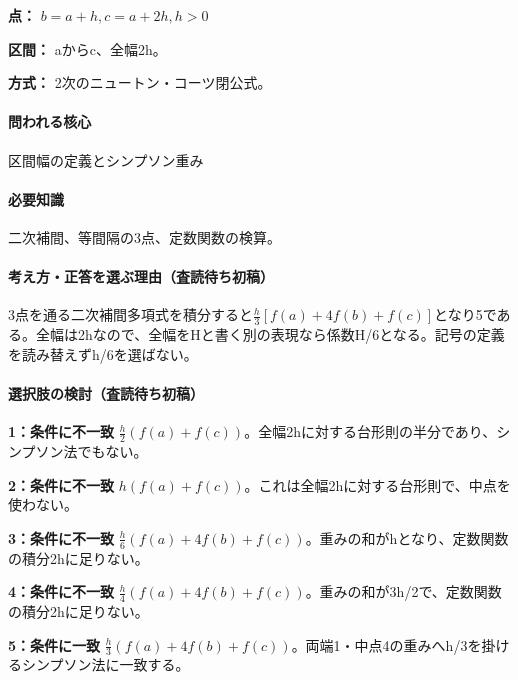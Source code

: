 \noindent\textbf{点：} \(b=a+h,c=a+2h,h>0\)\par

\noindent\textbf{区間：} aからc、全幅2h。\par

\noindent\textbf{方式：} 2次のニュートン・コーツ閉公式。\par

\paragraph{問われる核心} 区間幅の定義とシンプソン重み

\paragraph{必要知識} 二次補間、等間隔の3点、定数関数の検算。

\paragraph{考え方・正答を選ぶ理由（査読待ち初稿）} 3点を通る二次補間多項式を積分すると\(\frac h3[f(a)+4f(b)+f(c)]\)となり5である。全幅は2hなので、全幅をHと書く別の表現なら係数H/6となる。記号の定義を読み替えずh/6を選ばない。

\paragraph{選択肢の検討（査読待ち初稿）}\mbox{}\par

\noindent\textbf{1：条件に不一致} \(\frac h2(f(a)+f(c))\)。全幅2hに対する台形則の半分であり、シンプソン法でもない。\par

\noindent\textbf{2：条件に不一致} \(h(f(a)+f(c))\)。これは全幅2hに対する台形則で、中点を使わない。\par

\noindent\textbf{3：条件に不一致} \(\frac h6(f(a)+4f(b)+f(c))\)。重みの和がhとなり、定数関数の積分2hに足りない。\par

\noindent\textbf{4：条件に不一致} \(\frac h4(f(a)+4f(b)+f(c))\)。重みの和が3h/2で、定数関数の積分2hに足りない。\par

\noindent\textbf{5：条件に一致} \(\frac h3(f(a)+4f(b)+f(c))\)。両端1・中点4の重みへh/3を掛けるシンプソン法に一致する。\par


